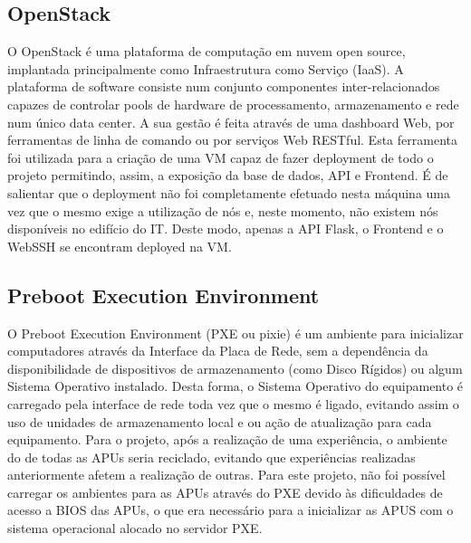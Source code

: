 \subsection{OpenStack}
O OpenStack é uma plataforma de computação em nuvem open source, implantada principalmente como Infraestrutura como Serviço (IaaS). A plataforma de software consiste num conjunto componentes inter-relacionados capazes de controlar pools de hardware de processamento, armazenamento e rede num único data center. A sua gestão é feita através de uma dashboard Web, por ferramentas de linha de comando ou por serviços Web RESTful.\newline
Esta ferramenta foi utilizada para a criação de uma VM capaz de fazer deployment de todo o projeto permitindo, assim, a exposição da base de dados, API e Frontend. É de salientar que o deployment não foi completamente efetuado nesta máquina uma vez que o mesmo exige a utilização de nós e, neste momento, não existem nós disponíveis no edifício do IT. Deste modo, apenas a API Flask, o Frontend e o WebSSH se encontram deployed na VM.

\subsection{Preboot Execution Environment}
O Preboot Execution Environment (PXE ou pixie) é um ambiente para inicializar computadores através da Interface da Placa de Rede, sem a dependência da disponibilidade de dispositivos de armazenamento (como Disco Rígidos) ou algum Sistema Operativo instalado. Desta forma, o Sistema Operativo do equipamento é carregado pela interface de rede toda vez que o mesmo é ligado, evitando assim o uso de unidades de armazenamento local e ou ação de atualização para cada equipamento.\newline
Para o projeto, após a realização de uma experiência, o ambiente do de todas as APUs seria reciclado, evitando que experiências realizadas anteriormente afetem a realização de outras.\newline
Para este projeto, não foi possível carregar os ambientes para as APUs através do PXE devido às dificuldades de acesso a BIOS das APUs, o que era necessário para a inicializar as APUS com o sistema operacional alocado no servidor PXE.

